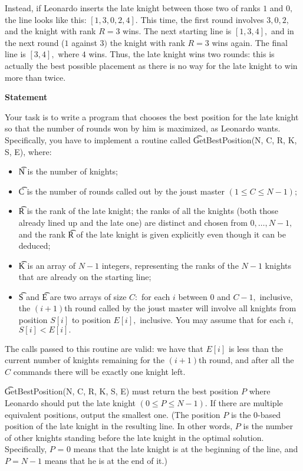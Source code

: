 Instead, if Leonardo inserts the late knight between those two of ranks $1$ and $0,$ the line looks like this: $[1, 3, 0, 2, 4].$ This time, the first round involves $3, 0, 2,$ and the knight with rank $R = 3$ wins. The next starting line is $[1, 3, 4],$ and in the next round ($1$ against $3)$ the knight with rank $R = 3$ wins again. The final line is $[3, 4],$ where $4$ wins. Thus, the late knight wins two rounds: this is actually the best possible placement as there is no way for the late knight to win more than twice. 

\bf{Statement}

Your task is to write a program that chooses the best position for the late knight so that the number of rounds won by him is maximized, as Leonardo wants. Specifically, you have to implement a routine called \t{GetBestPosition(N, C, R, K, S, E)}, where:
\begin{itemize}
\item \t{N} is the number of knights;
\item \t{C} is the number of rounds called out by the joust master $(1 \le C \le N - 1);$
\item \t{R} is the rank of the late knight; the ranks of all the knights (both those already lined up and the late one) are distinct and chosen from $0, \dots, N - 1,$ and the rank \t{R} of the late knight is given explicitly even though it can be deduced;
\item \t{K} is an array of $N - 1$ integers, representing the ranks of the $N - 1$ knights that are already on the starting line;
\item \t{S} and \t{E} are two arrays of size $C:$ for each $i$ between $0$ and $C - 1,$ inclusive, the $(i + 1)$th round called by the joust master will involve all knights from position $S[i]$ to position $E[i],$ inclusive. You may assume that for each $i,$ $S[i] < E[i].$
\end{itemize}

The calls passed to this routine are valid: we have that $E[i]$ is less than the current number of knights remaining for the $(i + 1)$th round, and after all the $C$ commands there will be exactly one knight left.

\t{GetBestPosition(N, C, R, K, S, E)} must return the best position $P$ where Leonardo should put the late knight $(0 \le P \le N - 1).$ If there are multiple equivalent positions, output the smallest one. (The position $P$ is the 0-based position of the late knight in the resulting line. In other words, $P$ is the number of other knights standing before the late knight in the optimal solution. Specifically, $P$ = 0 means that the late knight is at the beginning of the line, and $P = N - 1$ means that he is at the end of it.)

